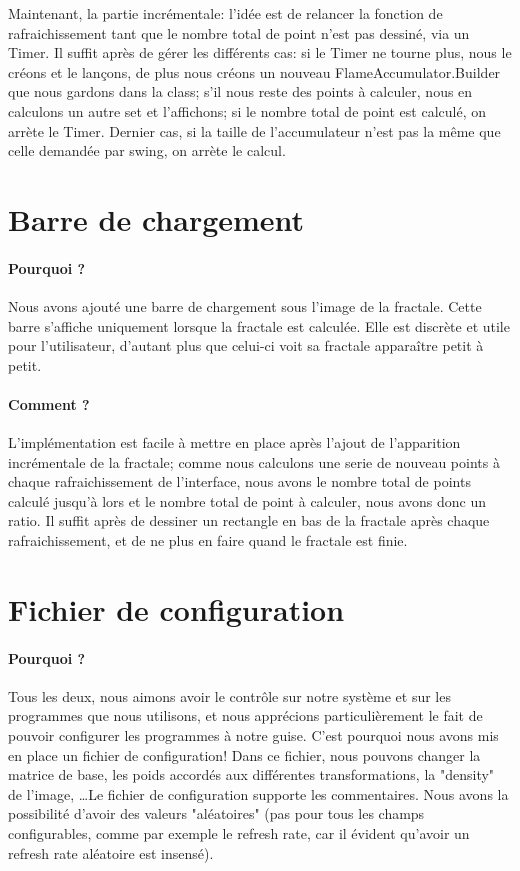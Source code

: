 \documentclass[a4paper]{report}
\begin{document}
Maintenant, la partie incrémentale: l'idée est de relancer la fonction de rafraichissement tant que le nombre total de point n'est pas dessiné, via un Timer. Il suffit après de gérer les différents cas: si le Timer ne tourne plus, nous le créons et le lançons, de plus nous créons un nouveau FlameAccumulator.Builder que nous gardons dans la class; s'il nous reste des points à calculer, nous en calculons un autre set et l'affichons; si le nombre total de point est calculé, on arrète le Timer. Dernier cas, si la taille de l'accumulateur n'est pas la même que celle demandée par swing, on arrète le calcul.

\section*{Barre de chargement}
\paragraph{Pourquoi ?}
Nous avons ajouté une barre de chargement sous l'image de la fractale. Cette barre s'affiche uniquement lorsque la fractale est calculée. Elle est discrète et utile pour l'utilisateur, d'autant plus que celui-ci voit sa fractale apparaître petit à petit.

\paragraph{Comment ?}
L'implémentation est facile à mettre en place après l'ajout de l'apparition incrémentale de la fractale; comme nous calculons une serie de nouveau points à chaque rafraichissement de l'interface, nous avons le nombre total de points calculé jusqu'à lors et le nombre total de point à calculer, nous avons donc un ratio. Il suffit après de dessiner un rectangle en bas de la fractale après chaque rafraichissement, et de ne plus en faire quand le fractale est finie.

\section*{Fichier de configuration}
\paragraph{Pourquoi ?}
Tous les deux, nous aimons avoir le contrôle sur notre système et sur les programmes que nous utilisons, et nous apprécions particulièrement le fait de pouvoir configurer les programmes à notre guise. C'est pourquoi nous avons mis en place un fichier de configuration! Dans ce fichier, nous pouvons changer la matrice de base, les poids accordés aux différentes transformations, la "density" de l'image, \ldots Le fichier de configuration supporte les commentaires. Nous avons la possibilité d'avoir des valeurs "aléatoires" (pas pour tous les champs configurables, comme par exemple le refresh rate, car il évident qu'avoir un refresh rate aléatoire est insensé).
\end{document}
